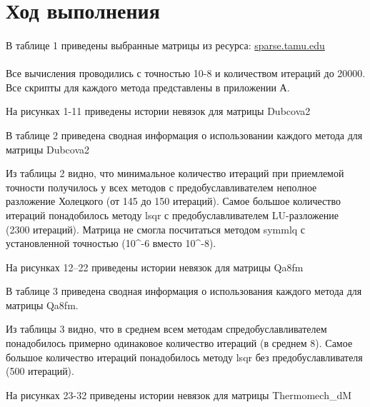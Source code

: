 \section*{Ход выполнения}

\paragraph{}
В таблице 1 приведены выбранные матрицы из ресурса: \href{https://sparse.tamu.edu/}{sparse.tamu.edu}\\

\\

Все вычисления проводились с точностью 10-8 и количеством итераций до 20000. Все скрипты для каждого метода представлены в приложении А.

На рисунках 1-11 приведены истории невязок для матрицы Dubcova2



В таблице 2 приведена сводная информация о использовании каждого метода для матрицы Dubcova2




Из таблицы 2 видно, что минимальное количество итераций при приемлемой точности получилось
у всех методов с предобуславливателем неполное разложение Холецкого (от 145 до 150 итераций).
Самое большое количество итераций понадобилось методу lsqr с предобуславливателем LU-разложение (2300 итераций).
Матрица не смогла посчитаться методом symmlq с установленной точностью (10^{-6}  вместо 10^{-8}).

На рисунках 12--22 приведены истории невязок для матрицы Qa8fm



В таблице 3 приведена сводная информация о использования каждого метода для матрицы Qa8fm.



Из таблицы 3 видно, что в среднем всем методам спредобуславливателем понадобилось примерно одинаковое количество
итераций (в среднем 8).
Самое большое количество итераций понадобилось методу lsqr без предобуславливателя (500 итераций).

На рисунках 23-32 приведены истории невязок для матрицы Thermomech_dM

